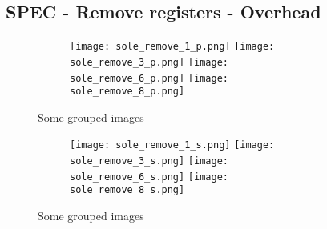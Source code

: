 \documentclass[11pt]{article}
\begin{document}
    \subsection*{SPEC - Remove registers - Overhead}

    \begin{figure}
        \begin{subfigure}{\linewidth}
            \texttt{[image: sole\_remove\_1\_p.png]}\hfill
            \texttt{[image: sole\_remove\_3\_p.png]}\hfill
            \texttt{[image: sole\_remove\_6\_p.png]}\hfill
            \texttt{[image: sole\_remove\_8\_p.png]}
            \caption{}
        \end{subfigure}\par\medskip
        \caption{Some grouped images}
        \label{fig:sole_figs}
    \end{figure}
    \begin{figure}
        \begin{subfigure}{\linewidth}
            \texttt{[image: sole\_remove\_1\_s.png]}\hfill
            \texttt{[image: sole\_remove\_3\_s.png]}\hfill
            \texttt{[image: sole\_remove\_6\_s.png]}\hfill
            \texttt{[image: sole\_remove\_8\_s.png]}
            \caption{}
        \end{subfigure}
        \caption{Some grouped images}
        \label{fig:sole_figs}
    \end{figure}
\end{document}
